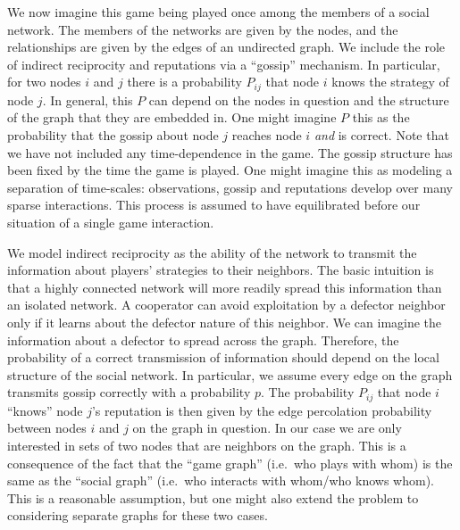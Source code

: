 \documentclass{article}
\renewcommand{\=}[1]{\stackrel{#1}{=}} %
\begin{document}
We now imagine this game being played once among the members of a social network. The members of the networks are given by the nodes, and the relationships are given by the edges of an undirected graph. We include the role of indirect reciprocity and reputations via a ``gossip'' mechanism. In particular, for two nodes $i$ and $j$ there is a probability $P_{ij}$ that node $i$ knows the strategy of node $j$. In general, this $P$ can depend on the nodes in question and the structure of the graph that they are embedded in. One might imagine $P$ this as the probability that the gossip about node $j$ reaches node $i$ \emph{and} is correct. Note that we have not included any time-dependence in the game. The gossip structure has been fixed by the time the game is played. One might imagine this as modeling a separation of time-scales: observations, gossip and reputations develop over many sparse interactions. This process is assumed to have equilibrated before our situation of a single game interaction.







We model indirect reciprocity as the ability of the network to transmit the information about players' strategies to their neighbors. The basic intuition is that a highly connected network will more readily spread this information than an isolated network. A cooperator can avoid exploitation by a defector neighbor only if it learns about the defector nature of this neighbor. We can imagine the information about a defector to spread across the graph. Therefore, the probability of a correct
transmission of information should depend on the local structure of the social network. In particular, we assume every edge on the graph transmits gossip correctly with a probability $p$. The probability $P_{ij}$ that node $i$ ``knows''
node $j$'s reputation is then given by the edge percolation probability between nodes $i$ and $j$ on the graph in question. In our case we are only interested in sets of two nodes that are neighbors on the graph. This is a consequence of the fact that the ``game graph'' (i.e.~who plays with whom) is the same as the ``social graph'' (i.e.~who interacts with whom/who knows whom). This is a reasonable assumption, but one might also extend the problem to considering separate graphs for these two cases.
\end{document}
